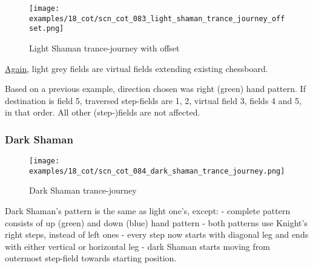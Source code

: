 \clearpage %

\noindent
\begin{figure}[!h]
\texttt{[image: examples/18\_cot/scn\_cot\_083\_light\_shaman\_trance\_journey\_offset.png]}
\caption{Light Shaman trance-journey with offset}
\label{fig:scn_cot_083_light_shaman_trance_journey_offset}
\end{figure}

\hyperref[fig:scn_hd_06_centaur_off_board]{Again},
light grey fields are virtual fields extending existing chessboard.

Based on a previous example, direction chosen was right (green) hand pattern.
If destination is field 5, traversed step-fields are 1, 2, virtual field 3,
fields 4 and 5, in that order. All other (step-)fields are not affected.

\clearpage %

\subsubsection*{Dark Shaman}
\label{sec:Conquest of Tlalocan/Trance-journey/Movement/Dark Shaman}

\vspace*{-1.5\baselineskip}
\noindent
\begin{figure}[!h]
\texttt{[image: examples/18\_cot/scn\_cot\_084\_dark\_shaman\_trance\_journey.png]}
\vspace*{-1.4\baselineskip}
\caption{Dark Shaman trance-journey}
\label{fig:scn_cot_084_dark_shaman_trance_journey}
\end{figure}

\vspace*{-0.5\baselineskip}
Dark Shaman's pattern is the same as light one's, except:\newline
- complete pattern consists of up (green) and down (blue) hand pattern\newline
- both patterns use Knight's right steps, instead of left ones\newline
- every step now starts with diagonal leg and ends with either vertical or horizontal leg\newline
- dark Shaman starts moving from outermost step-field towards starting position.

